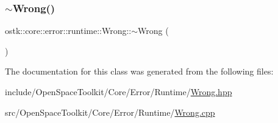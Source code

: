 \mbox{\label{classostk_1_1core_1_1error_1_1runtime_1_1_wrong_abc368bd88382a208840fd799fd7dc93b}} 
\subsubsection{\texorpdfstring{$\sim$\+Wrong()}{~Wrong()}}
{\footnotesize\ttfamily ostk\+::core\+::error\+::runtime\+::\+Wrong\+::$\sim$\+Wrong (\begin{DoxyParamCaption}{ }\end{DoxyParamCaption})}



The documentation for this class was generated from the following files\+:\begin{DoxyCompactItemize}
\item 
include/\+Open\+Space\+Toolkit/\+Core/\+Error/\+Runtime/\hyperlink{_wrong_8hpp}{Wrong.\+hpp}\item 
src/\+Open\+Space\+Toolkit/\+Core/\+Error/\+Runtime/\hyperlink{_wrong_8cpp}{Wrong.\+cpp}\end{DoxyCompactItemize}
